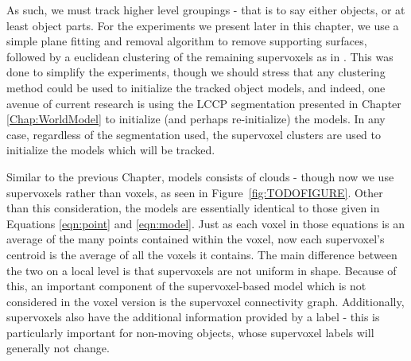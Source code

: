 
As such, we must track higher level groupings - that is to say either objects, or at least object parts. For the experiments we present later in this chapter, we use a simple plane fitting and removal algorithm to remove supporting surfaces, followed by a euclidean clustering of the remaining supervoxels as in \cite{Radu3dIsHere}. This was done to simplify the experiments, though we should stress that any clustering method could be used to initialize the tracked object models, and indeed, one avenue of current research is using the LCCP segmentation presented in Chapter \ref{Chap:WorldModel} to initialize (and perhaps re-initialize) the models. In any case, regardless of the segmentation used, the supervoxel clusters are used to initialize the models which will be tracked. 

Similar to the previous Chapter, models consists of clouds - though now we use supervoxels rather than voxels, as seen in Figure~\ref{fig:TODOFIGURE}. Other than this consideration, the models are essentially identical to those given in Equations \ref{eqn:point} and \ref{eqn:model}. Just as each voxel in those equations is an average of the many points contained within the voxel, now each supervoxel's centroid is the average of all the voxels it contains. The main difference between the two on a local level is that supervoxels are not uniform in shape. Because of this, an important component of the supervoxel-based model which is not considered in the voxel version is the supervoxel connectivity graph. Additionally, supervoxels also have the additional information provided by a label - this is particularly important for non-moving objects, whose supervoxel labels will generally not change.


